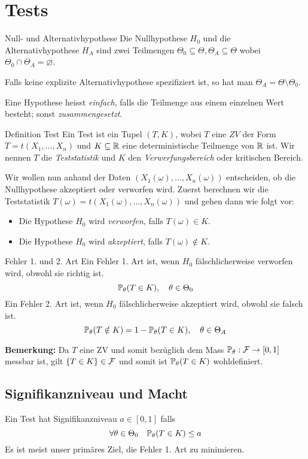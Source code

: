 \section{Tests}
\begin{subbox}{Null- und Alternativhypothese}
	Die Nullhypothese \(H_0\) und die Alternativhypothese \(H_A\) sind zwei Teilmengen \(\Theta_0 \subseteq \Theta, \Theta_A \subseteq \Theta\) wobei \(\Theta_0 \cap \Theta_A = \varnothing\). 

	Falls keine explizite Alternativhypothese spezifiziert ist, so hat man $\Theta_A = \Theta \setminus \Theta_0$. 

	Eine Hypothese heisst \textit{einfach}, falls die Teilmenge aus einem einzelnen Wert besteht; sonst \textit{zusammengesetzt}.
\end{subbox}

\begin{mainbox}{Definition Test}
	Ein Test ist ein Tupel \((T,K)\), wobei \(T\) eine \(ZV\) der Form \(T=t(X_1, \ldots, X_n)\) und \(K \subseteq \R\) eine deterministische Teilmenge von \(\R\) ist. Wir nennen \(T\) die \textit{Teststatistik} und \(K\) den \textit{Verwerfungsbereich} oder kritischen Bereich.
\end{mainbox}

Wir wollen nun anhand der Daten \((X_1(\omega), \ldots, X_n(\omega))\) entscheiden, ob die Nullhypothese akzeptiert oder verworfen wird. Zuerst berechnen wir die Teststatistik \(T(\omega) = t(X_1(\omega), \ldots, X_n(\omega))\) und gehen dann wie folgt vor:
\begin{itemize}
	\item Die Hypothese \(H_0\) wird \textit{verworfen}, falls \(T(\omega) \in K\).
	\item Die Hypothese \(H_0\) wird \textit{akzeptiert}, falls \(T(\omega) \notin K\).
\end{itemize}
\begin{subbox}{Fehler 1. und 2. Art}
	Ein Fehler 1. Art ist, wenn \(H_0\) fälschlicherweise verworfen wird, obwohl sie richtig ist.
	\[\P_\theta(T \in K), \quad \theta \in \Theta_0\]
	\noindent Ein Fehler 2. Art ist, wenn \(H_0\) fälschlicherweise akzeptiert wird, obwohl sie falsch ist.
	\[\P_\theta(T\notin K) = 1 - \P_\theta(T \in K), \quad \theta \in \Theta_A\]
\end{subbox}
\textbf{Bemerkung: } Da $T$ eine ZV und somit bezüglich dem Mass $\P_\theta: \F \to [0,1]$ messbar ist, gilt $\{T \in K\} \in \F$ und somit ist $\P_\theta(T \in K)$ wohldefiniert. 
\subsection{Signifikanzniveau und Macht}
Ein Test hat Signifikanzniveau \(a \in [0,1]\) falls
\[\forall \theta \in \Theta_0 \quad \P_\theta(T \in K) \le a\]
Es ist meist unser primäres Ziel, die Fehler 1. Art zu minimieren.

